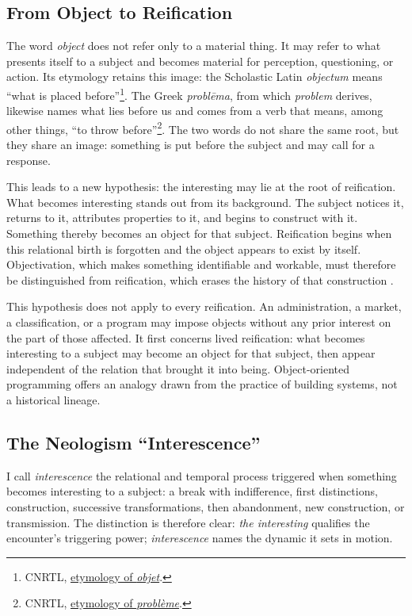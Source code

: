 \documentclass[11pt,a4paper]{article}
\begin{document}
\subsection{From Object to Reification}

The word \emph{object} does not refer only to a material thing. It may refer to
what presents itself to a subject and becomes material for perception,
questioning, or action. Its etymology retains this image: the Scholastic Latin
\emph{objectum} means ``what is placed before''\footnote{CNRTL,
\href{https://www.cnrtl.fr/etymologie/objet}{etymology of \emph{objet}}.}.
The Greek \emph{problēma}, from which \emph{problem} derives, likewise names
what lies before us and comes from a verb that means, among other things, ``to
throw before''\footnote{CNRTL,
\href{https://www.cnrtl.fr/etymologie/probleme}{etymology of
\emph{problème}}.}. The two words do not share the same root, but they share an
image: something is put before the subject and may call for a response.

This leads to a new hypothesis: the interesting may lie at the root of
reification. What becomes interesting stands out from its background. The
subject notices it, returns to it, attributes properties to it, and begins to
construct with it. Something thereby becomes an object for that subject.
Reification begins when this relational birth is forgotten and the object
appears to exist by itself. Objectivation, which makes something identifiable
and workable, must therefore be distinguished from reification, which erases
the history of that construction \parencite{pachet2004reification}.

This hypothesis does not apply to every reification. An administration, a
market, a classification, or a program may impose objects without any prior
interest on the part of those affected. It first concerns lived reification:
what becomes interesting to a subject may become an object for that subject,
then appear independent of the relation that brought it into being.
Object-oriented programming offers an analogy drawn from the practice of
building systems, not a historical lineage.

\subsection{The Neologism ``Interescence''}

I call \emph{interescence} the relational and temporal process triggered when
something becomes interesting to a subject: a break with indifference, first
distinctions, construction, successive transformations, then abandonment,
new construction, or transmission. The distinction is therefore clear: \emph{the
interesting} qualifies the encounter's triggering power; \emph{interescence}
names the dynamic it sets in motion.
\end{document}
